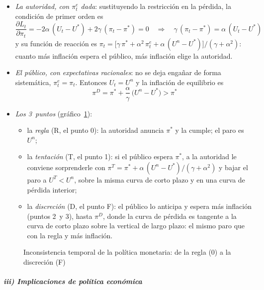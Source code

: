 \documentclass[11pt]{article}
\begin{document}
\begin{itemize}
\item \emph{La autoridad, con $\pi^e_t$ dada}: sustituyendo la restricción en la pérdida, la condición de primer orden es
  \begin{equation*}
  \frac{\partial L_t}{\partial\pi_t}=-2\alpha\,(U_t-U^*)+2\gamma\,(\pi_t-\pi^*)=0\quad\Longrightarrow\quad \gamma\,(\pi_t-\pi^*)=\alpha\,(U_t-U^*)
  \end{equation*}
  y su función de reacción es $\pi_t=\big[\gamma\,\pi^*+\alpha^2\,\pi^e_t+\alpha\,(U^n-U^*)\big]/(\gamma+\alpha^2)$: cuanto más inflación espera el público, más inflación elige la autoridad.
\item \emph{El público, con expectativas racionales}: no se deja engañar de forma sistemática, $\pi^e_t=\pi_t$. Entonces $U_t=U^n$ y la inflación de equilibrio es
  \begin{equation}
  \pi^D=\pi^*+\frac{\alpha}{\gamma}\,\big(U^n-U^*\big)>\pi^* \label{eq:sesgo}
  \end{equation}
\item \emph{Los 3~puntos} (gráfico~\ref{fig:barro-gordon}):
  \begin{itemize}
  \item la \emph{regla} (R, el punto 0): la autoridad anuncia $\pi^*$ y la cumple; el paro es $U^n$;
  \item la \emph{tentación} (T, el punto 1): si el público espera $\pi^*$, a la autoridad le conviene sorprenderle con $\pi^T=\pi^*+\alpha\,(U^n-U^*)/(\gamma+\alpha^2)$ y bajar el paro a $U^T<U^n$, sobre la misma curva de corto plazo y en una curva de pérdida interior;
  \item la \emph{discreción} (D, el punto F): el público lo anticipa y espera más inflación (puntos 2~y 3), hasta $\pi^D$, donde la curva de pérdida es tangente a la curva de corto plazo sobre la vertical de largo plazo: el mismo paro que con la regla y más inflación.
  \end{itemize}
\end{itemize}

\begin{figure}[H]
\centering
\caption{Inconsistencia temporal de la política monetaria: de la regla (0) a la discreción (F)}\label{fig:barro-gordon}
\end{figure}

\subparagraph{iii) Implicaciones de política económica}
\end{document}
